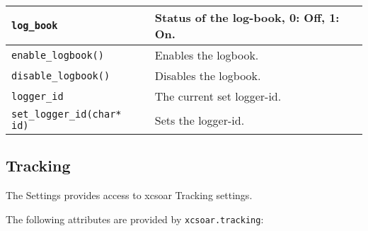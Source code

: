 \begin{maxipage}
\begin{tabularx}{1.9\textwidth}{l|X}
\hline

\verb|log_book| &  Status of the log-book, 0: Off, 1: On.\\

\hline

\verb|enable_logbook()| &  Enables the logbook.\\

\hline

\verb|disable_logbook()| &  Disables the logbook.\\

\hline

\verb|logger_id| &  The current set logger-id.\\

\hline

\verb|set_logger_id(char* id)| &  Sets the logger-id.\\

\end{tabularx}
\end{maxipage}

\subsection{Tracking}

The Settings provides access to xcsoar Tracking settings.

The following attributes are provided by \verb|xcsoar.tracking|:

